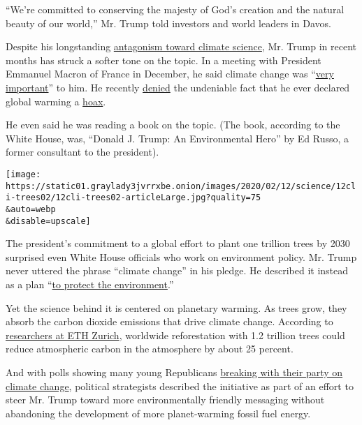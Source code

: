 ``We're committed to conserving the majesty of God's creation and the
natural beauty of our world,'' Mr. Trump told investors and world
leaders in Davos.

Despite his longstanding
\href{https://www.nytimes3xbfgragh.onion/2019/12/28/climate/trump-administration-war-on-science.html}{antagonism
toward climate science}, Mr. Trump in recent months has struck a softer
tone on the topic. In a meeting with President Emmanuel Macron of France
in December, he said climate change was
``\href{https://twitter.com/atrupar/status/1201897601509023745}{very
important}'' to him. He recently
\href{https://thehill.com/policy/energy-environment/477548-trump-says-nothings-a-hoax-about-climate-change}{denied}
the undeniable fact that he ever declared global warming a
\href{https://twitter.com/realDonaldTrump/status/427226424987385856?s=20}{hoax}.

He even said he was reading a book on the topic. (The book, according to
the White House, was, ``Donald J. Trump: An Environmental Hero'' by Ed
Russo, a former consultant to the president).

\texttt{[image: https://static01.graylady3jvrrxbe.onion/images/2020/02/12/science/12cli-trees02/12cli-trees02-articleLarge.jpg?quality=75\\\&auto=webp\\\&disable=upscale]}

The president's commitment to a global effort to plant one trillion
trees by 2030 surprised even White House officials who work on
environment policy. Mr. Trump never uttered the phrase ``climate
change'' in his pledge. He described it instead as a plan
``\href{https://www.whitehouse.gov/briefings-statements/remarks-president-trump-state-union-address-3/}{to
protect the environment}.''

Yet the science behind it is centered on planetary warming. As trees
grow, they absorb the carbon dioxide emissions that drive climate
change. According to
\href{https://www.sciencedaily.com/releases/2019/07/190704191350.htm}{researchers
at ETH Zurich}, worldwide reforestation with 1.2 trillion trees could
reduce atmospheric carbon in the atmosphere by about 25 percent.

And with polls showing many young Republicans
\href{https://www.pewresearch.org/science/2019/11/25/u-s-public-views-on-climate-and-energy/?utm_source=adaptivemailer\&utm_medium=email\&utm_campaign=19-11-25\%20climate\&org=982\&lvl=100\&ite=5010\&lea=1139465\&ctr=0\&par=1\&trk=}{breaking
with their party on climate change}, political strategists described the
initiative as part of an effort to steer Mr. Trump toward more
environmentally friendly messaging without abandoning the development of
more planet-warming fossil fuel energy.

